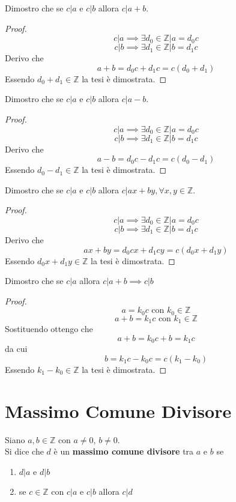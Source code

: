 \documentclass[a4paper,12pt, oneside]{book}
\begin{document}
	\begin{shaded}
		\begin{esempio}
			Dimostro che se $c|a$ e $c|b$ allora $c|a+b$.
			\begin{proof}
				$$c|a \implies \exists d_0 \in \mathbb{Z} | a=d_0c$$
				$$c|b \implies \exists d_1 \in \mathbb{Z} | b=d_1c$$
				Derivo che
				$$a+b = d_0c + d_1c = c(d_0+d_1)$$
				Essendo $d_0+d_1 \in \mathbb{Z}$ la tesi è dimostrata.
			\end{proof}
		\end{esempio}
		\begin{esempio}
			Dimostro che se $c|a$ e $c|b$ allora $c|a-b$.
			\begin{proof}
				$$c|a \implies \exists d_0 \in \mathbb{Z} | a=d_0c$$
				$$c|b \implies \exists d_1 \in \mathbb{Z} | b=d_1c$$
				Derivo che
				$$a-b = d_0c - d_1c = c(d_0-d_1)$$
				Essendo $d_0-d_1 \in \mathbb{Z}$ la tesi è dimostrata.
			\end{proof}
		\end{esempio}
		\begin{esempio}
			Dimostro che se $c|a$ e $c|b$ allora $c|ax+by, \forall x,y \in \mathbb{Z}$.
			\begin{proof}
				$$c|a \implies \exists d_0 \in \mathbb{Z} | a=d_0c$$
				$$c|b \implies \exists d_1 \in \mathbb{Z} | b=d_1c$$
				Derivo che
				$$ax+by = d_0cx + d_1cy = c(d_0x+d_1y)$$
				Essendo $d_0x+d_1y \in \mathbb{Z}$ la tesi è dimostrata.
			\end{proof}
		\end{esempio}
		\begin{esempio}
			Dimostro che se $c|a$ allora $c|a+b \implies c|b$
			\begin{proof}
				$$a = k_0c \mbox{ con } k_0 \in \mathbb{Z}$$
				$$a+b = k_1c \mbox{ con } k_1 \in \mathbb{Z}$$
				Sostituendo ottengo che
				$$a + b = k_0c + b = k_1c$$
				da cui $$b = k_1c-k_0c = c(k_1-k_0)$$
				Essendo $k_1-k_0 \in \mathbb{Z}$ la tesi è dimostrata.
			\end{proof}
		\end{esempio}
	\end{shaded}
	\section{Massimo Comune Divisore}
	\begin{definizione}
		Siano $a,b \in \mathbb{Z}$ con $a \not = 0$, $b \not = 0$.\\
		Si dice che $d$ è un \textbf{massimo comune divisore} tra $a$ e $b$ se
		\begin{enumerate}
			\item $d|a$ e $d|b$
			\item se $c \in \mathbb{Z}$ con $c|a$ e $c|b$ allora $c|d$
		\end{enumerate}
	\end{definizione}
\end{document}
